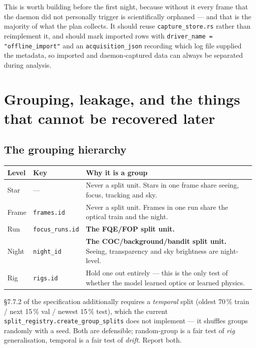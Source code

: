 \documentclass[11pt]{article}
\newcommand{\co}[1]{\texttt{\small #1}}
\begin{document}
This is worth building before the first night, because without it every frame
that the daemon did not personally trigger is scientifically orphaned --- and
that is the majority of what the plan collects. It should reuse
\co{capture\_store.rs} rather than reimplement it, and should mark imported rows
with \co{driver\_name = "offline\_import"} and an \co{acquisition\_json}
recording which log file supplied the metadata, so imported and daemon-captured
data can always be separated during analysis.

\section{Grouping, leakage, and the things that cannot be recovered later}

\subsection{The grouping hierarchy}

\begin{center}
\small
\begin{tabular}{@{}llp{}@{}}
\toprule
\textbf{Level} & \textbf{Key} & \textbf{Why it is a group} \\
\midrule
Star & --- & Never a split unit. Stars in one frame share seeing, focus, tracking and sky. \\
Frame & \co{frames.id} & Never a split unit. Frames in one run share the optical train and the night. \\
Run & \co{focus\_runs.id} & \textbf{The FQE/FOP split unit.} \\
Night & \co{night\_id} & \textbf{The COC/background/bandit split unit.} Seeing, transparency and sky brightness are night-level. \\
Rig & \co{rigs.id} & Hold one out entirely --- this is the only test of whether the model learned optics or learned physics. \\
\bottomrule
\end{tabular}
\end{center}

\S7.7.2 of the specification additionally requires a \emph{temporal} split
(oldest 70\,\% train / next 15\,\% val / newest 15\,\% test), which the current
\co{split\_registry.create\_group\_splits} does not implement --- it shuffles
groups randomly with a seed. Both are defensible; random-group is a fair test of
\emph{rig} generalisation, temporal is a fair test of \emph{drift}. Report both.
\end{document}
